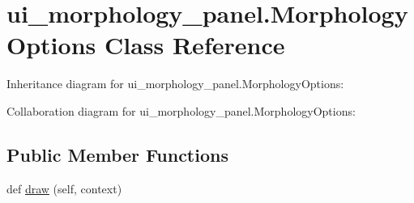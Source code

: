 \hypertarget{classui__morphology__panel_1_1MorphologyOptions}{}\section{ui\+\_\+morphology\+\_\+panel.\+Morphology\+Options Class Reference}
\label{classui__morphology__panel_1_1MorphologyOptions}


 




Inheritance diagram for ui\+\_\+morphology\+\_\+panel.\+Morphology\+Options\+:


Collaboration diagram for ui\+\_\+morphology\+\_\+panel.\+Morphology\+Options\+:
\subsection*{Public Member Functions}
\begin{DoxyCompactItemize}
\item 
def \hyperlink{classui__morphology__panel_1_1MorphologyOptions_a30478751995bd541c1a8f7b252d85b5c}{draw} (self, context)
\end{DoxyCompactItemize}
